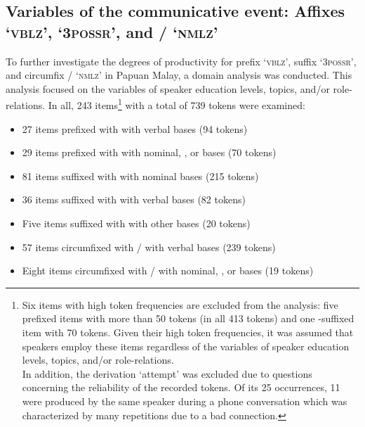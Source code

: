 \subsection[Variables of the {communicative event}]{Variables of the {communicative event}: Affixes  ‘\textsc{vblz}’,  ‘\textsc{3possr}’, and \textitbf{-}/\textitbf{-} ‘\textsc{nmlz}’}\label{Para_3.1.8}
To further investigate the degrees of productivity for prefix  ‘\textsc{vblz}’, suffix  ‘\textsc{3possr}’, and circumfix \textitbf{-}/\textitbf{-} ‘\textsc{nmlz}’ in Papuan Malay, a domain analysis was conducted. This analysis focused on the variables of speaker education levels, topics, and/or role-relations. In all, 243 items\footnote{Six items with high token frequencies are excluded from the analysis: five prefixed items with more than 50 tokens (in all 413 tokens) and one -suffixed item with 70 tokens. Given their high token frequencies, it was assumed that speakers employ these items regardless of the variables of speaker education levels, topics, and/or role-relations.\\
In addition, the derivation  ‘attempt’ was excluded due to questions concerning the reliability of the recorded tokens. Of its 25 occurrences, 11 were produced by the same speaker during a phone conversation which was characterized by many repetitions due to a bad connection.} with a total of 739 tokens were examined:


\begin{itemize}
\item 
27 items prefixed with  with verbal bases (94 tokens)
\item 
29 items prefixed with  with nominal, , or  bases (70 tokens)
\item 
81 items suffixed with  with nominal bases (215 tokens)
\end{itemize}
\begin{itemize}
\item 
36 items suffixed with  with verbal bases (82 tokens)
\item 
Five items suffixed with  with other bases (20 tokens)

\item 
57 items circumfixed with \textitbf{-}/\textitbf{-} with verbal bases (239 tokens)

\item 
Eight items circumfixed with \textitbf{-}/\textitbf{-} with nominal, , or  bases (19 tokens)

\end{itemize}



